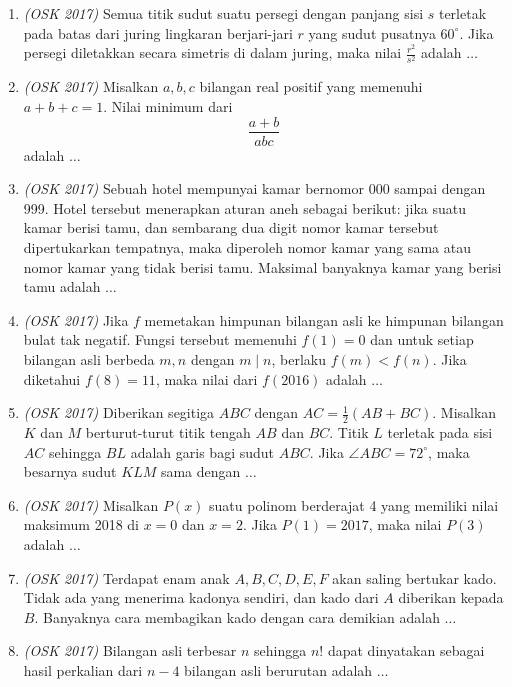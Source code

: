 \begin{enumerate}
	\item \textit{(OSK 2017)}  Semua titik sudut suatu persegi dengan panjang sisi $s$ terletak pada batas dari juring lingkaran berjari-jari $r$ yang sudut pusatnya $60^\circ$. Jika persegi diletakkan secara simetris di dalam juring, maka nilai $\frac{r^2}{s^2}$ adalah $\dots$
	
	\item \textit{(OSK 2017)}  Misalkan $a, b, c$ bilangan real positif yang memenuhi $a + b + c = 1$. Nilai minimum dari 
	\[
	\frac{a + b}{abc}
	\]
	adalah $\dots$
	
	\item \textit{(OSK 2017)}  Sebuah hotel mempunyai kamar bernomor 000 sampai dengan 999. Hotel tersebut menerapkan aturan aneh sebagai berikut: jika suatu kamar berisi tamu, dan sembarang dua digit nomor kamar tersebut dipertukarkan tempatnya, maka diperoleh nomor kamar yang sama atau nomor kamar yang tidak berisi tamu. Maksimal banyaknya kamar yang berisi tamu adalah $\dots$
	
	\item \textit{(OSK 2017)} Jika $f$ memetakan himpunan bilangan asli ke himpunan bilangan bulat tak negatif. Fungsi tersebut memenuhi $f(1) = 0$ dan untuk setiap bilangan asli berbeda $m,n$ dengan $m \mid n$, berlaku $f(m) < f(n)$. Jika diketahui $f(8) = 11$, maka nilai dari $f(2016)$ adalah $\dots$
	
	\item \textit{(OSK 2017)} Diberikan segitiga $ABC$ dengan $AC = \tfrac12 (AB + BC)$. Misalkan $K$ dan $M$ berturut-turut titik tengah $AB$ dan $BC$. Titik $L$ terletak pada sisi $AC$ sehingga $BL$ adalah garis bagi sudut $ABC$. Jika $\angle ABC = 72^\circ$, maka besarnya sudut $KLM$ sama dengan $\dots$
	
	\item \textit{(OSK 2017)} Misalkan $P(x)$ suatu polinom berderajat 4 yang memiliki nilai maksimum 2018 di $x=0$ dan $x=2$. Jika $P(1)=2017$, maka nilai $P(3)$ adalah $\dots$
	
	\item \textit{(OSK 2017)} Terdapat enam anak $A,B,C,D,E,F$ akan saling bertukar kado. Tidak ada yang menerima kadonya sendiri, dan kado dari $A$ diberikan kepada $B$. Banyaknya cara membagikan kado dengan cara demikian adalah $\dots$
	
	\item \textit{(OSK 2017)} Bilangan asli terbesar $n$ sehingga $n!$ dapat dinyatakan sebagai hasil perkalian dari $n-4$ bilangan asli berurutan adalah $\dots$
	

\end{enumerate}
